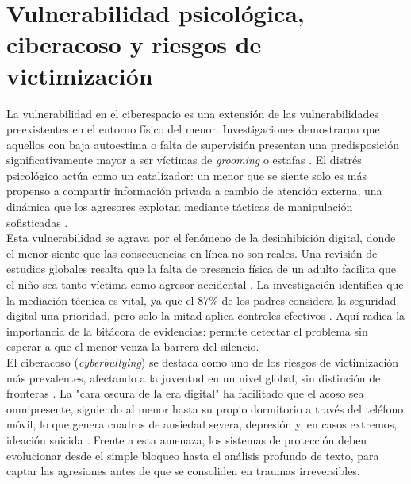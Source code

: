 \section{Vulnerabilidad psicológica, ciberacoso y riesgos de victimización}

La vulnerabilidad en el ciberespacio es una extensión de las vulnerabilidades preexistentes en el entorno físico del menor. Investigaciones demostraron que aquellos con baja autoestima o falta de supervisión presentan una predisposición significativamente mayor a ser víctimas de \textit{grooming} o estafas \cite{el-asam_psychological_2022, ayyash_cybersecurity_2024}. El distrés psicológico actúa como un catalizador: un menor que se siente solo es más propenso a compartir información privada a cambio de atención externa, una dinámica que los agresores explotan mediante tácticas de manipulación sofisticadas \cite{razi_sliding_2023, page_psychological_2025}. \\

Esta vulnerabilidad se agrava por el fenómeno de la desinhibición digital, donde el menor siente que las consecuencias en línea no son reales. Una revisión de estudios globales resalta que la falta de presencia física de un adulto facilita que el niño sea tanto víctima como agresor accidental \cite{zhu_cyberbullying_2021, yusuf_lets_2023}. La investigación identifica que la mediación técnica es vital, ya que el 87\% de los padres considera la seguridad digital una prioridad, pero solo la mitad aplica controles efectivos \cite{ayyash_cybersecurity_2024, aznar-martinez_uso_2024}. Aquí radica la importancia de la bitácora de evidencias: permite detectar el problema sin esperar a que el menor venza la barrera del silencio. \\

El ciberacoso (\textit{cyberbullying}) se destaca como uno de los riesgos de victimización más prevalentes, afectando a la juventud en un nivel global, sin distinción de fronteras \cite{craig_social_2020}. La "cara oscura de la era digital" ha facilitado que el acoso sea omnipresente, siguiendo al menor hasta su propio dormitorio a través del teléfono móvil, lo que genera cuadros de ansiedad severa, depresión y, en casos extremos, ideación suicida \cite{wiederhold_dark_2024}. Frente a esta amenaza, los sistemas de protección deben evolucionar desde el simple bloqueo hasta el análisis profundo de texto, para captar las agresiones antes de que se consoliden en traumas irreversibles.\\

